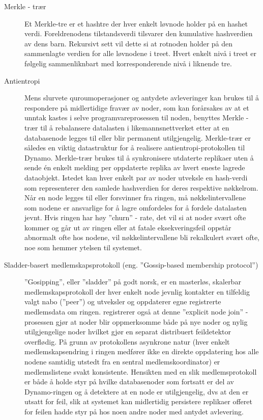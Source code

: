 \begin{description}
  \item [Merkle - trær] Et Merkle-tre er et hashtre der hver enkelt løvnode holder på en hashet verdi. Foreldrenodens tilstandsverdi tilsvarer den kumulative hashverdien av dens barn. Rekursivt sett vil dette si at rotnoden holder på den sammenlagte verdien for alle løvnodene i treet. Hvert enkelt nivå i treet er følgelig sammenliknbart med korresponderende nivå i liknende tre.
  \item [Antientropi] Mens slurvete quroumoperasjoner og antydete avleveringer kan brukes til å respondere på midlertidige fravær av noder, som kan forårsakes av at et unntak kastes i selve programvareprosessen til noden, benyttes Merkle - trær til å rebalansere datalasten i likemannsnettverket etter at en databasenode legges til eller blir permanent utilgjengelig. Merkle-trær er således en viktig datastruktur for å realisere antientropi-protokollen til Dynamo. Merkle-trær brukes til å synkronisere utdaterte replikaer uten å sende én enkelt melding per oppdaterte replika av hvert eneste lagrede dataobjekt. Istedet kan hver enkelt par av noder utveksle en hash-verdi som representerer den samlede hashverdien for deres respektive nøkkelrom. Når en node legges til eller forsvinner fra ringen, må nøkkelintervallene som nodene er ansvarlige for å lagre omfordeles for å fordele datalasten jevnt. Hvis ringen har høy ''churn'' - rate, det vil si at noder svært ofte kommer og går ut av ringen eller at fatale eksekveringsfeil oppstår abnormalt ofte hos nodene, vil nøkkelintervallene bli rekalkulert svært ofte, noe som hemmer ytelsen til systemet.
  \item [Sladder-basert medlemskapsprotokoll (eng. ''Gossip-based membership protocol'')] ''Gosipping'', eller ''sladder'' på godt norsk, er en masterløs, skalerbar medlemskapsprotokoll der hver enkelt node jevnlig kontakter en tilfeldig valgt nabo (''peer'') og utveksler og oppdaterer egne registrerte medlemsdata om ringen. \cite{decandia2007} registrerer også at denne ''explicit node join'' - prosessen gjør at noder blir oppmerksomme både på nye noder og nylig utilgjengelige noder hvilket gjør en separat distribuert feildetektor overflødig. På grunn av protokollens asynkrone natur (hver enkelt medlemskapsendring i ringen medfører ikke en direkte oppdatering hos alle nodene samtidig utstedt fra en sentral medlemskoordinator) er medlemslistene svakt konsistente. Hensikten med en slik medlemsprotokoll er både å holde styr på hvilke databasenoder som fortsatt er del av Dynamo-ringen og å detektere at en node er utilgjengelig, dvs at den er utsatt for feil, slik at systemet kan midlertidig persistere replikaer offeret for feilen hadde styr på hos noen andre noder med antydet avlevering.

\end{description}
